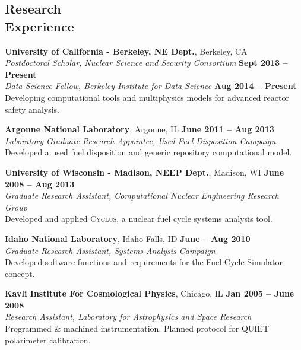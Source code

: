 \documentclass[margin,line]{resume}
\newcommand{\Cyclus}{\textsc{Cyclus}\xspace}
\begin{document}
\begin{resume}
    \section{\mysidestyle Research\\Experience}
    \textbf{University of California - Berkeley, NE Dept.}, Berkeley, CA \\
		\textsl{Postdoctoral Scholar, Nuclear Science and Security Consortium} \hfill \textbf{Sept 2013 -- Present}\\
		\textsl{Data Science Fellow, Berkeley Institute for Data Science} \hfill \textbf{Aug 2014 -- Present}\\
                Developing computational tools and multiphysics models for advanced reactor safety analysis.  \vspace{-3mm}

    \textbf{Argonne National Laboratory}, Argonne, IL \hfill \textbf{June 2011 -- Aug 2013}\\
		\textsl{Laboratory Graduate Research Appointee, Used Fuel Disposition Campaign}\\ 
		Developed a used fuel disposition and generic repository computational model.  \vspace{-3mm}

    \textbf{University of Wisconsin - Madison, NEEP Dept.}, Madison, WI \hfill \textbf{June 2008 -- Aug 2013}\\
		\textsl{Graduate Research Assistant, Computational Nuclear Engineering Research Group}\\ 
		Developed and applied \Cyclus, a nuclear fuel cycle systems analysis tool.  \vspace{-3mm}

    \textbf{Idaho National Laboratory}, Idaho Falls, ID \hfill \textbf{June -- Aug 2010}\\
		\textsl{Graduate Research Assistant, Systems Analysis Campaign}\\ 
		Developed software functions and requirements for the Fuel Cycle Simulator concept.  \vspace{-3mm}

    \textbf{Kavli Institute For Cosmological Physics}, Chicago, IL \hfill \textbf{Jan 2005 -- June 2008}\\
                \textsl{Research Assistant, Laboratory for Astrophysics and Space Research}\\
                Programmed \& machined instrumentation. Planned protocol for QUIET polarimeter calibration.  \vspace{-3mm}


\end{resume}
\end{document}
